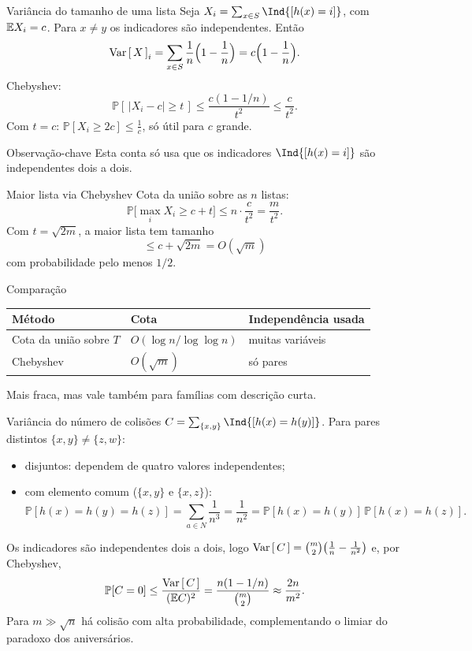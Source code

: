 \documentclass[aspectratio=169,11pt]{beamer}
\newcommand{\PP}{\mathbb P}
\begin{document}
\begin{frame}{Variância do tamanho de uma lista}
  Seja $X_i=\sum_{x\in S}\Ind{[h(x)=i]}$, com $\mathbb{E} X_i=c$. Para $x\neq y$ os
  indicadores são independentes. Então
  \[
    \Var X_i=\sum_{x\in S}\frac1n\Bigl(1-\frac1n\Bigr)
    =c\Bigl(1-\frac1n\Bigr).
  \]
  \pause
  Chebyshev:
  \[
    \PP[\,|X_i-c|\ge t\,]\le\frac{c(1-1/n)}{t^2}\le\frac c{t^2}.
  \]
  \pause
  Com $t=c$: $\PP[X_i\ge2c]\le\frac1c$, só útil para $c$ grande.
  \vspace{0.5em}
  \begin{block}{Observação-chave}
    Esta conta só usa que os indicadores $\Ind{[h(x)=i]}$ são independentes
    \alert{dois a dois}.
  \end{block}
\end{frame}

\begin{frame}{Maior lista via Chebyshev}
  Cota da união sobre as $n$ listas:
  \[
    \PP\bigl[\max_iX_i\ge c+t\bigr]\le n\cdot\frac c{t^2}=\frac m{t^2}.
  \]
  Com $t=\sqrt{2m}$, a maior lista tem tamanho
  \[
    \le c+\sqrt{2m}=O(\sqrt m)
  \]
  com probabilidade pelo menos $1/2$.
  \pause
  \begin{exampleblock}{Comparação}
    \begin{center}
    \begin{tabular}{lll}
      \textbf{Método} & \textbf{Cota} & \textbf{Independência usada} \\\hline
      Cota da união sobre $T$ & $O(\log n/\log\log n)$ & muitas variáveis \\
      Chebyshev & $O(\sqrt m)$ & só pares
    \end{tabular}
    \end{center}
  \end{exampleblock}
  \small Mais fraca, mas vale também para famílias com descrição curta.
\end{frame}

\begin{frame}{Variância do número de colisões}
  $C=\sum_{\{x,y\}}\Ind{[h(x)=h(y)]}$. Para pares distintos
  $\{x,y\}\neq\{z,w\}$:
  \begin{itemize}
  \item disjuntos: dependem de quatro valores independentes;
  \item com elemento comum ($\{x,y\}$ e $\{x,z\}$):
    \[
      \PP[h(x)=h(y)=h(z)]=\sum_{a\in N}\frac1{n^3}=\frac1{n^2}
      =\PP[h(x)=h(y)]\,\PP[h(x)=h(z)].
    \]
  \end{itemize}
  \pause
  Os indicadores são independentes dois a dois, logo
  $\Var C=\binom m2\bigl(\frac1n-\frac1{n^2}\bigr)$ e, por Chebyshev,
  \[
    \PP[C=0]\le\frac{\Var C}{(\E C)^2}=\frac{n(1-1/n)}{\binom m2}\approx\frac{2n}{m^2}.
  \]
  Para $m\gg\sqrt n$ há colisão com alta probabilidade, complementando o
  limiar do paradoxo dos aniversários.
\end{frame}
\end{document}
